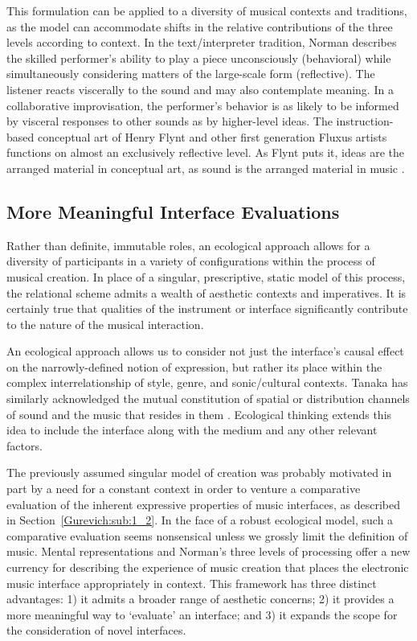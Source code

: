 This formulation can be applied to a diversity of musical contexts and traditions, as the model can accommodate shifts in the relative contributions of the three levels according to context. In the text/interpreter tradition, Norman describes the skilled performer's ability to play a piece unconsciously (behavioral) while simultaneously considering matters of the large-scale form (reflective). The listener reacts viscerally to the sound and may also contemplate meaning. In a collaborative improvisation, the performer's behavior is as likely to be informed by visceral responses to other sounds as by higher-level ideas. The instruction-based conceptual art of Henry Flynt and other first generation Fluxus artists functions on almost an exclusively reflective level. As Flynt puts it, ideas are the arranged material in conceptual art, as sound is the arranged material in music \cite{Flynt:2007}.

\subsection{More Meaningful Interface Evaluations}
\label{Gurevich:sub:4_3}
Rather than definite, immutable roles, an ecological approach allows for a diversity of participants in a variety of configurations within the process of musical creation. In place of a singular, prescriptive, static model of this process, the relational scheme admits a wealth of aesthetic contexts and imperatives. It is certainly true that qualities of the instrument or interface significantly contribute to the nature of the musical interaction.

An ecological approach allows us to consider not just the interface's causal effect on the narrowly-defined notion of expression, but rather its place within the complex interrelationship of style, genre, and sonic/cultural contexts. Tanaka has similarly acknowledged the mutual constitution of spatial or distribution channels of sound and the music that resides in them \cite{Tanaka:2005}. Ecological thinking extends this idea to include the interface along with the medium and any other relevant factors.

The previously assumed singular model of creation was probably motivated in part by a need for a constant context in order to venture a comparative evaluation of the inherent expressive properties of music interfaces, as described in Section~\ref{Gurevich:sub:1_2}. In the face of a robust ecological model, such a comparative evaluation seems nonsensical unless we grossly limit the definition of music. Mental representations and Norman's three levels of processing offer a new currency for describing the experience of music creation that places the electronic music interface appropriately in context. This framework has three distinct advantages: 1) it admits a broader range of aesthetic concerns; 2) it provides a more meaningful way to `evaluate' an interface; and 3) it expands the scope for the consideration of novel interfaces.

